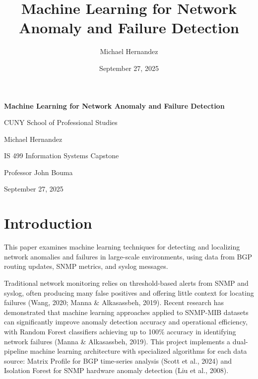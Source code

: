 \documentclass[11pt]{article}
\title{Machine Learning for Network Anomaly and Failure Detection}
\author{Michael Hernandez}
\date{September 27, 2025}
\begin{document}
\begin{titlepage}
\centering
\vspace*{2cm}

{\Large \textbf{Machine Learning for Network Anomaly and Failure Detection}}

\vspace{1.5cm}

{\large CUNY School of Professional Studies}

\vspace{0.5cm}

{\large Michael Hernandez}

\vspace{0.5cm}

{\large IS 499 Information Systems Capstone}

\vspace{0.5cm}

{\large Professor John Bouma}

\vspace{0.5cm}

{\large September 27, 2025}

\vfill

\end{titlepage}

\tableofcontents
\newpage

\section{Introduction}

This paper examines machine learning techniques for detecting and localizing network anomalies and failures in large-scale environments, using data from BGP routing updates, SNMP metrics, and syslog messages.

Traditional network monitoring relies on threshold-based alerts from SNMP and syslog, often producing many false positives and offering little context for locating failures (Wang, 2020; Manna \& Alkasassbeh, 2019). Recent research has demonstrated that machine learning approaches applied to SNMP-MIB datasets can significantly improve anomaly detection accuracy and operational efficiency, with Random Forest classifiers achieving up to 100\% accuracy in identifying network failures (Manna \& Alkasassbeh, 2019). This project implements a dual-pipeline machine learning architecture with specialized algorithms for each data source: Matrix Profile for BGP time-series analysis (Scott et al., 2024) and Isolation Forest for SNMP hardware anomaly detection (Liu et al., 2008).
\end{document}
